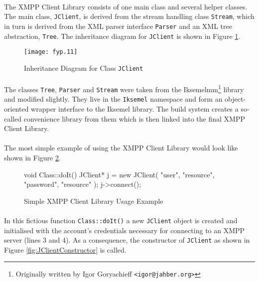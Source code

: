 \paragraph{}
The XMPP Client Library consists of one main class and several helper classes. The main class, \texttt{JClient}, is derived from the stream handling class \texttt{Stream}, which in turn is derived from the XML parser interface \texttt{Parser} and an XML tree abstraction, \texttt{Tree}. The inheritance diagram for \texttt{JClient} is shown in Figure \ref{fig:inhjclient}.

\begin{figure}[H]
\begin{center}
\texttt{[image: fyp.11]}
\end{center}
\caption{Inheritance Diagram for Class \texttt{JClient}}
\label{fig:inhjclient}
\end{figure}

\paragraph{}
The classes \texttt{Tree}, \texttt{Parser} and \texttt{Stream} were taken from the Iksemelmm\footnote{Originally written by Igor Goryachieff \texttt{<igor@jahber.org>}} library and modified slightly. They live in the \texttt{Iksemel} namespace and form an object-oriented wrapper interface to the Iksemel library. The build system creates a so-called convenience library from them which is then linked into the final XMPP Client Library.

\paragraph{}
The most simple example of using the XMPP Client Library would look like shown in Figure \ref{fig:usageExample}.

\begin{figure}[H]
\begin{listing}{1}
void Class::doIt()
{
  JClient* j = new JClient( "user", "resource",
                            "password", "resource" );
  j->connect();
}
\end{listing}
\caption{Simple XMPP Client Library Usage Example}
\label{fig:usageExample}
\end{figure}

\paragraph{}
In this fictious function \texttt{Class::doIt()} a new \texttt{JClient} object is created and initialised with the account's credentials necessary for connecting to an XMPP server (lines 3 and 4). As a consequence, the constructor of \texttt{JClient} as shown in Figure \ref{fig:JClientConstructor} is called.

